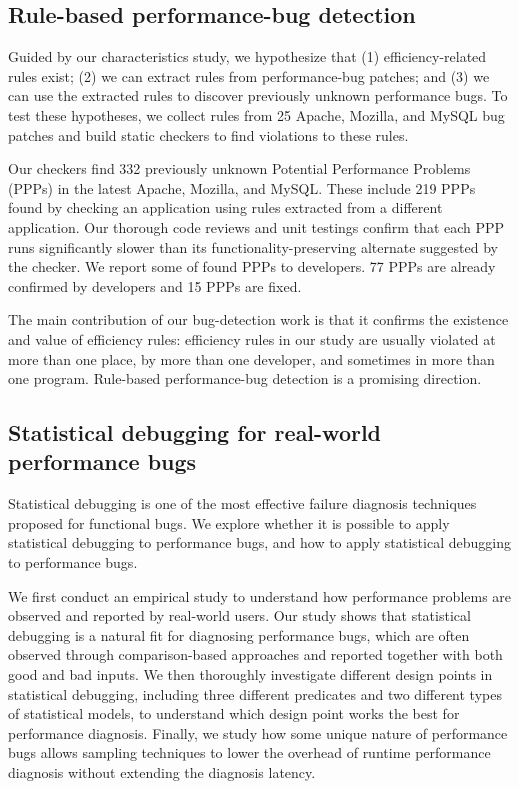 \subsection{Rule-based performance-bug detection}

Guided by our characteristics study, we hypothesize that 
(1) efficiency-related rules exist; 
(2) we can extract rules from performance-bug patches; 
and (3) we can use the extracted rules to discover previously unknown performance bugs. 
To test these hypotheses, we collect rules from 25 Apache, Mozilla, and MySQL bug patches 
and build static checkers to find violations to these rules.

Our checkers find 332 previously unknown Potential Performance Problems (PPPs) 
in the latest Apache, Mozilla, and MySQL. 
These include 219 PPPs found by checking an application using rules extracted from a different application. 
Our thorough code reviews and unit testings confirm that each PPP runs significantly slower 
than its functionality-preserving alternate suggested by the checker. 
We report some of found PPPs to developers. 
77 PPPs are already confirmed by developers and 15 PPPs are fixed.  

The main contribution of our bug-detection work is that it 
confirms the existence and value of efficiency rules: 
efficiency rules in our study are usually violated at more than one place, 
by more than one developer, 
and sometimes in more than one program. 
Rule-based performance-bug detection is a promising direction. 

\subsection{Statistical debugging for real-world performance bugs}
Statistical debugging is one of the most effective failure diagnosis techniques proposed for functional bugs. 
We explore whether it is possible to apply statistical debugging to performance bugs, 
and how to apply statistical debugging to performance bugs. 

We first conduct an empirical study to understand how performance problems are observed and reported by real-world users. 
Our study shows that statistical debugging is a natural fit for diagnosing performance bugs, 
which are often observed through comparison-based approaches and reported together with both good and bad inputs. 
We then thoroughly investigate different design points in statistical debugging, 
including three different predicates and two different types of statistical models, 
to understand which design point works the best for performance diagnosis. 
Finally, we study how some unique nature of performance bugs allows sampling techniques 
to lower the overhead of runtime performance diagnosis without extending the diagnosis latency. 

